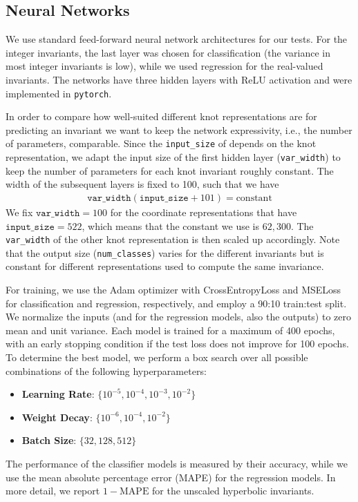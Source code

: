 \documentclass[11pt]{article}
\numberwithin{equation}{section}
\begin{document}
\subsection{Neural Networks}
\label{sec:NNs}
We use standard feed-forward neural network architectures for our tests. For the integer invariants, the last layer was chosen for classification (the variance in most integer invariants is low), while we used regression for the real-valued invariants. The networks have three hidden layers with ReLU activation and were implemented in \texttt{pytorch}. 

In order to compare how well-suited different knot representations are for predicting an invariant we want to keep the network expressivity, i.e., the number of parameters, comparable. Since the \texttt{input\_size} of depends on the knot representation, we adapt the input size of the first hidden layer (\texttt{var\_width}) to keep the number of parameters for each knot invariant roughly constant. The width of the subsequent layers is fixed to 100, such that we have
\begin{align}
    \texttt{var\_width}(\texttt{input\_size} + 101) = \text{constant}  
\end{align}
We fix $\texttt{var\_width}=100$ for the coordinate representations that have $\texttt{input\_size}=522$, which means that the constant we use is $62{,}300$. The \texttt{var\_width} of the other knot representation is then scaled up accordingly. Note that the output size (\texttt{num\_classes}) varies for the different invariants but is constant for different representations used to compute the same invariance. 

For training, we use the Adam optimizer with CrossEntropyLoss and MSELoss for classification and regression, respectively, and employ a 90:10 train:test split. We normalize the inputs (and for the regression models, also the outputs) to zero mean and unit variance. Each model is trained for a maximum of 400 epochs, with an early stopping condition if the test loss does not improve for 100 epochs. To determine the best model, we perform a box search over all possible combinations of the following hyperparameters:
\begin{itemize}
    \item \textbf{Learning Rate}: \( \{10^{-5}, 10^{-4}, 10^{-3}, 10^{-2}\} \)
    \item \textbf{Weight Decay}: \( \{10^{-6}, 10^{-4}, 10^{-2}\} \)
    \item \textbf{Batch Size}: \( \{32, 128, 512\}\)
\end{itemize}
The performance of the classifier models is measured by their accuracy, while we use the mean absolute percentage error (MAPE) for the regression models. In more detail, we report $1-\text{MAPE}$ for the unscaled hyperbolic invariants.
\end{document}

